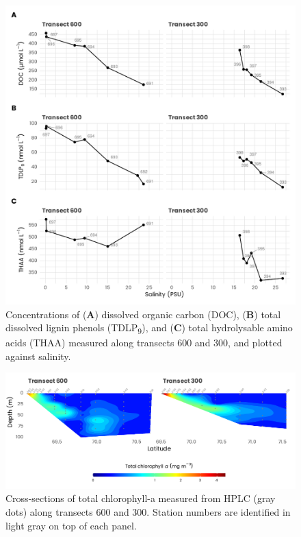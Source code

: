 \documentclass[essd, manuscript]{copernicus}
\begin{document}
\clearpage

\begin{figure}[H]
	\centering
	\includegraphics[scale = 1]{../../../graphs/fig08.pdf}
	\caption{Concentrations of (\textbf{A}) dissolved organic carbon (DOC), (\textbf{B}) total dissolved lignin phenols (TDLP\textsubscript{9}), and (\textbf{C}) total hydrolysable amino acids (THAA) measured along transects 600 and 300, and plotted against salinity.}
\end{figure}

\clearpage

\begin{figure}[H]
	\centering
	\includegraphics[scale = 1]{../../../graphs/fig09.pdf}
	\caption{Cross-sections of total chlorophyll-a measured from HPLC (gray dots) along transects 600 and 300. Station numbers are identified in light gray on top of each panel.}
\end{figure}
\end{document}

